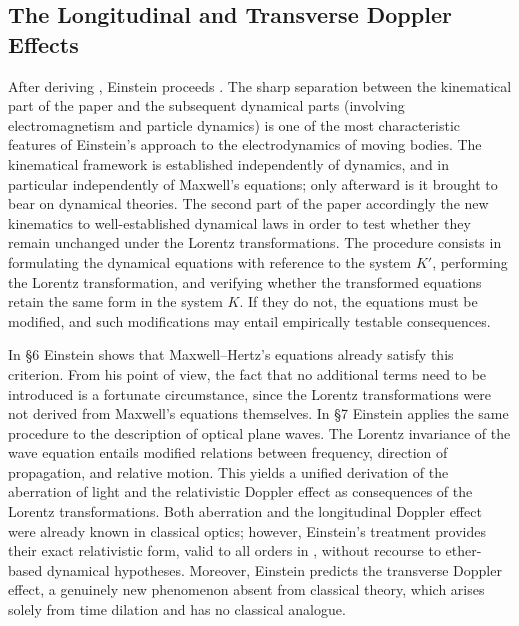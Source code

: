 \documentclass[pdflatex]{sn-jnl} %
\begin{document}
\subsection{The Longitudinal and Transverse Doppler Effects}
%
After deriving , Einstein proceeds  \citep[907]{Einstein1905}. The sharp separation between the kinematical part of the paper and the subsequent dynamical parts (involving electromagnetism and particle dynamics) is one of the most characteristic features of Einstein’s approach to the electrodynamics of moving bodies. The kinematical framework is established independently of dynamics, and in particular independently of Maxwell’s equations; only afterward is it brought to bear on dynamical theories. The second part of the paper accordingly  the new kinematics to well-established dynamical laws in order to test whether they remain unchanged under the Lorentz transformations. The procedure consists in formulating the dynamical equations with reference to the  system $K'$, performing the Lorentz transformation, and verifying whether the transformed equations retain the same form in the  system $K$. If they do not, the equations must be modified, and such modifications may entail empirically testable consequences.



In \S6 Einstein shows that Maxwell–Hertz’s equations already satisfy this criterion. From his point of view, the fact that no additional terms need to be introduced is a fortunate circumstance, since the Lorentz transformations were not derived from Maxwell’s equations themselves. In \S7 Einstein applies the same procedure to the description of optical plane waves. The Lorentz invariance of the wave equation entails modified relations between frequency, direction of propagation, and relative motion. This yields a unified derivation of the aberration of light and the relativistic Doppler effect as consequences of the Lorentz transformations. Both aberration and the longitudinal Doppler effect were already known in classical optics; however, Einstein’s treatment provides their exact relativistic form, valid to all orders in \betafactorh, without recourse to ether-based dynamical hypotheses. Moreover, Einstein predicts the transverse Doppler effect, a genuinely new phenomenon absent from classical theory, which arises solely from time dilation and has no classical analogue.
\end{document}
